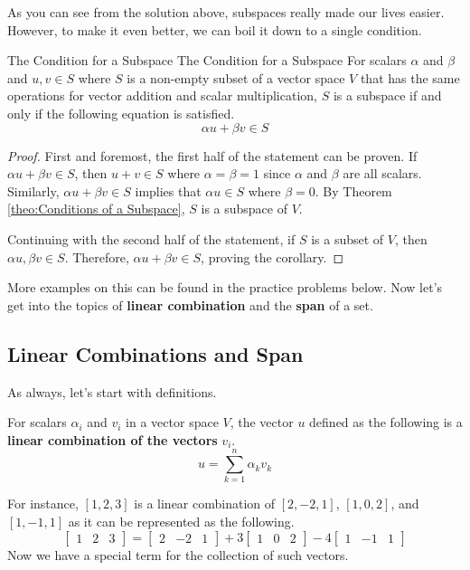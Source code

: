 \documentclass[../main.tex]{subfiles}
\begin{document}
As you can see from the solution above, subspaces really made our
lives easier. However, to make it even better, we can boil it down
to a single condition.

\begin{corollary}{The Condition for a Subspace}
{The Condition for a Subspace}
For scalars $\alpha$ and $\beta$ and $u, v \in S$ where $S$ is a
non-empty subset of a vector space $V$ that has the same operations
for vector addition and scalar multiplication, $S$ is a subspace if
and only if the following equation is satisfied.
\[
\alpha u + \beta v \in S
\]
\end{corollary}
\begin{proof}
First and foremost, the first half of the statement can be proven.
If $\alpha u + \beta v \in S$, then $u + v \in S$ where $\alpha =
\beta = 1$ since $\alpha$ and $\beta$ are all scalars. Similarly,
$\alpha u + \beta v \in S$ implies that $\alpha u \in S$ where
$\beta = 0$. By Theorem \ref{theo:Conditions of a Subspace}, $S$ is a
subspace of $V$.

Continuing with the second half of the statement, if $S$ is a subset
of $V$, then $\alpha u, \beta v \in S$. Therefore, $\alpha u +
\beta v \in S$, proving the corollary.
\end{proof}

More examples on this can be found in the practice problems below.
Now let's get into the topics of \textbf{linear combination} and the
\textbf{span} of a set.

\subsection{Linear Combinations and Span}

As always, let's start with definitions.

\begin{definition}
For scalars $\alpha_i$ and $v_i$ in a vector space $V$, the vector
$u$ defined as the following is a \textbf{linear combination of the
vectors} $v_i$.
\[
u = \sum_{k = 1}^n \alpha_k v_k
\]
\end{definition}

For instance, $[1, 2, 3]$ is a linear combination of $[2, -2, 1]$,
$[1, 0, 2]$, and $[1, -1, 1]$ as it can be represented as the
following.
\[
\begin{bmatrix}
    1 & 2 & 3
\end{bmatrix}
=
\begin{bmatrix}
    2 & -2 & 1
\end{bmatrix}
+
3\begin{bmatrix}
    1 & 0 & 2
\end{bmatrix}
-
4\begin{bmatrix}
    1 & -1 & 1
\end{bmatrix}
\]
Now we have a special term for the collection of such vectors.
\end{document}

